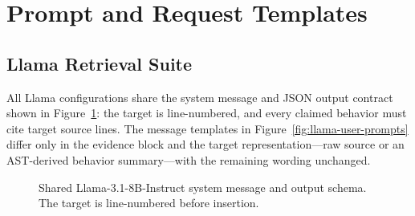\appendix
\section{Prompt and Request Templates}
\label{app:prompts}

\subsection{Llama Retrieval Suite}

All Llama configurations share the system message and JSON output
contract shown in Figure~\ref{fig:llama-shared-prompt}: the target is
line-numbered, and every claimed behavior must cite target source lines. The
message templates in Figure~\ref{fig:llama-user-prompts} differ only in
the evidence block and the target representation---raw source or an
AST-derived behavior summary---with the remaining wording unchanged.

\begin{figure}[!t]
    \centering
    \hfill
    \caption{Shared Llama-3.1-8B-Instruct system message and output
    schema. The target is line-numbered before insertion.}
    \label{fig:llama-shared-prompt}
\end{figure}


